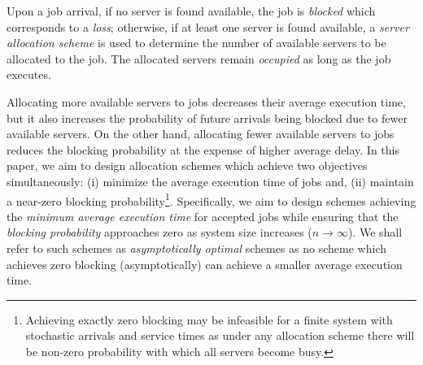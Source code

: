 \documentclass[a4paper]{article}
\theoremstyle{plain}
\newtheorem{remark}{Remark}
\theoremstyle{definition}
\theoremstyle{case}
\theoremstyle{remark}
\begin{document}
Upon a job arrival, if no server is found available, the job is {\em blocked} which corresponds to a {\em loss}; otherwise, if at least one server is found available, a {\em server allocation scheme} is used to determine the number of available servers to be allocated to the job. The allocated servers remain {\em occupied} as long as the job executes. 

Allocating more available servers to jobs decreases their average execution time, but it also increases the probability of future arrivals being blocked due to fewer available servers. On the other hand, allocating fewer available servers to jobs reduces the blocking probability at the expense of higher average delay. In this paper, we aim to design allocation schemes which achieve two objectives simultaneously: (i) minimize the average execution time of jobs and, (ii) maintain a near-zero blocking probability\footnote{Achieving exactly zero blocking may be infeasible for a finite system with stochastic arrivals and service times as under any allocation scheme there will be non-zero probability with which all servers become busy.}. Specifically, we aim to design schemes achieving the {\em minimum average execution time} for accepted jobs while ensuring that the {\em blocking probability} approaches zero as system size increases ($n \to \infty$). We shall refer to such schemes as {\em asymptotically optimal} schemes as no scheme which achieves zero blocking (asymptotically) can achieve a smaller average execution time.


\end{document}
